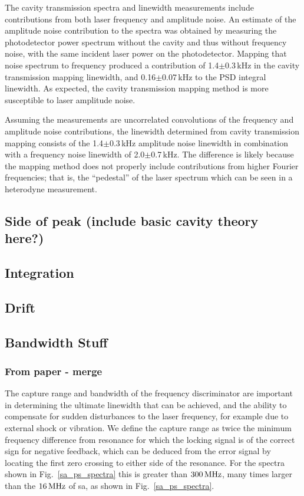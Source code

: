 The cavity transmission spectra and linewidth measurements include contributions from both laser frequency and amplitude noise.  An estimate of the amplitude noise contribution to the spectra was obtained by measuring the photodetector power spectrum without the cavity and thus without frequency noise, with the same incident laser power on the photodetector.  Mapping that noise spectrum to frequency produced a contribution of 1.4$\pm$0.3\,kHz in the cavity transmission mapping linewidth,  and 0.16$\pm$0.07\,kHz to the PSD integral linewidth.  As expected, the cavity transmission mapping method is more susceptible to laser amplitude noise. 

Assuming the measurements are uncorrelated convolutions of the frequency and amplitude noise contributions, the linewidth determined from cavity transmission mapping consists of the 1.4$\pm$0.3\,kHz amplitude noise linewidth in combination with a frequency noise linewidth of 2.0$\pm$0.7\,kHz.  The difference is likely because the mapping method does not properly include contributions from higher Fourier frequencies; that is, the ``pedestal'' of the laser spectrum which can be seen in a heterodyne measurement.

\subsection{Side of peak (include basic cavity theory here?)}
\subsection{Integration}
\subsection{Drift}
\subsection{Bandwidth Stuff}
\subsubsection{From paper - merge}
\label{bandwidth_section}
The capture range and bandwidth of the frequency discriminator are important in determining the ultimate linewidth that can be achieved, and the ability to compensate for sudden disturbances to the laser frequency, for example due to external shock or vibration.
We define the capture range as twice the minimum frequency difference from resonance for which the locking signal is of the correct sign for negative feedback, which can be deduced from the error signal by locating the first zero crossing to either side of the resonance. For the spectra shown in Fig.~\ref{sa_ps_spectra} this is greater than $300\rm\,MHz$, many times larger than the $16\rm\,MHz$ of \gls*{sa}, as shown in Fig.~\ref{sa_ps_spectra}.

